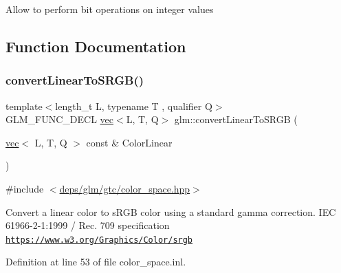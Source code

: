 Allow to perform bit operations on integer values 

\subsection{Function Documentation}
\mbox{\label{group__gtc__color__space_ga42239e7b3da900f7ef37cec7e2476579}} 
\subsubsection{\texorpdfstring{convert\+Linear\+To\+S\+R\+G\+B()}{convertLinearToSRGB()}\hspace{0.1cm}{\footnotesize\ttfamily [1/2]}}
{\footnotesize\ttfamily template$<$length\+\_\+t L, typename T , qualifier Q$>$ \\
G\+L\+M\+\_\+\+F\+U\+N\+C\+\_\+\+D\+E\+CL \hyperlink{structglm_1_1vec}{vec}$<$L, T, Q$>$ glm\+::convert\+Linear\+To\+S\+R\+GB (\begin{DoxyParamCaption}\item[{\hyperlink{structglm_1_1vec}{vec}$<$ L, T, Q $>$ const \&}]{Color\+Linear }\end{DoxyParamCaption})}



{\ttfamily \#include $<$\hyperlink{gtc_2color__space_8hpp}{deps/glm/gtc/color\+\_\+space.\+hpp}$>$}

Convert a linear color to s\+R\+GB color using a standard gamma correction. I\+EC 61966-\/2-\/1\+:1999 / Rec. 709 specification \href{https://www.w3.org/Graphics/Color/srgb}{\tt https\+://www.\+w3.\+org/\+Graphics/\+Color/srgb} 

Definition at line 53 of file color\+\_\+space.\+inl.

\mbox{\label{group__gtc__color__space_gaace0a21167d13d26116c283009af57f6}} 
